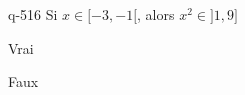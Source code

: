 \begin{truefalse}{q-516}
Si $x\in [-3,-1[$, alors $x^2\in ]1,9]$
\item* Vrai
\item Faux
\end{truefalse}

